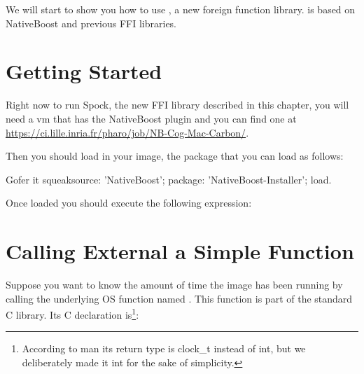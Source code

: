 \documentclass[a4paper,10pt,twoside]{book}
\begin{document}
We will start to show you how to use \Spock, a new foreign function library. \Spock is based on NativeBoost and previous FFI libraries.


\section{Getting Started}



Right now to run Spock, the new FFI library described in this chapter, you will need a vm that has the NativeBoost plugin and  you can find one at \url{https://ci.lille.inria.fr/pharo/job/NB-Cog-Mac-Carbon/}.  

Then you should load in your image, the package  that you can load as follows:
\begin{code}{}
Gofer it
        squeaksource: 'NativeBoost';
        package: 'NativeBoost-Installer';
        load.
\end{code}

Once loaded you should execute the following expression: 


%
%
%
%
%
%
%
% 
%


\section{Calling External a Simple Function}


Suppose you want to know the amount of time the image has been running by calling the underlying OS function named . 
This function is part of the standard C library. Its C declaration is\footnote{According to man its return type is clock\_t instead of int, but we deliberately made it int for the sake of simplicity. }:
\end{document}
